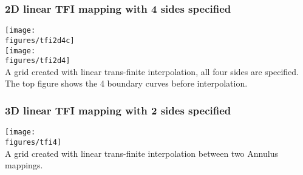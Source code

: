 \subsubsection{2D linear TFI mapping with 4 sides specified}
\noindent
\begin{minipage}{.4\linewidth}
{\footnotesize
{}
}
\end{minipage}\hfill
\begin{minipage}{.6\linewidth}
  \begin{center}
   \texttt{[image: \\figures/tfi2d4c]} \\
   \texttt{[image: \\figures/tfi2d4]} \\
  {A grid created with linear trans-finite interpolation, all four sides are specified. The top
     figure shows the 4 boundary curves before interpolation.} \label{fig:tfi2d4}
  \end{center}
\end{minipage}

\subsubsection{3D linear TFI mapping with 2 sides specified}
\noindent
\begin{minipage}{.4\linewidth}
{\footnotesize
{}
}
\end{minipage}\hfill
\begin{minipage}{.6\linewidth}
  \begin{center}
   \texttt{[image: \\figures/tfi4]} \\
  {A grid created with linear trans-finite interpolation between two Annulus mappings.}
  \end{center}
\end{minipage}



